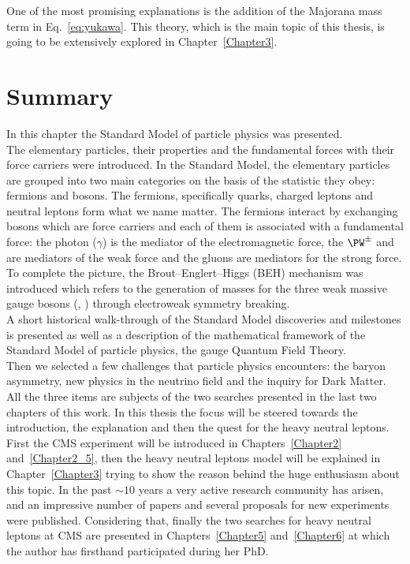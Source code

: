 One of the most promising explanations is the addition of the Majorana mass term in Eq.~\ref{eq:yukawa}. This theory, which is the main topic of this thesis, is going to be extensively explored in Chapter~\ref{Chapter3}.
\clearpage
\section{Summary}\label{sec:summaryC1}
In this chapter the Standard Model of particle physics was presented.\\
The elementary particles, 
their properties and the fundamental forces with their force carriers were introduced. 
In the Standard Model, the elementary particles are grouped into two main categories on the basis of the statistic they obey: fermions and bosons. The fermions, specifically quarks, charged leptons and neutral leptons form what we name matter. The fermions interact by exchanging bosons which are force carriers and each of them is associated with a fundamental force: the photon ($\gamma$) is the mediator of the electromagnetic force, the $\PW^{\pm}$ and \PZ are mediators of the weak force and the gluons are mediators for the strong force.
To complete the picture, the Brout–Englert–Higgs (BEH) mechanism was introduced which refers to the generation of masses for the three weak massive gauge bosons (\PW, \PZ) through electroweak symmetry breaking.\\
A short historical walk-through of the Standard Model discoveries and milestones is presented as well as a description of the mathematical framework of the Standard Model of particle physics, the gauge Quantum Field Theory.\\
Then we selected a few challenges that particle
physics encounters: the baryon asymmetry, new physics in the neutrino field and
the inquiry for Dark Matter. All the three items are subjects of the two searches presented in the last two chapters of this work. In this thesis the focus will be steered towards the introduction, the explanation and then the quest for the heavy neutral leptons. \\
First the CMS experiment will be introduced in Chapters~\ref{Chapter2} and~\ref{Chapter2_5}, then the heavy neutral leptons model will be explained in Chapter~\ref{Chapter3} trying to show the reason behind the huge enthusiasm about this topic. In the past $\sim10$ years a very active research community has arisen, and an impressive number of papers and several proposals for new experiments were published. Considering that, finally the two searches for heavy neutral leptons at CMS are presented in Chapters~\ref{Chapter5} and~\ref{Chapter6} at which the author has firsthand participated during her PhD.


